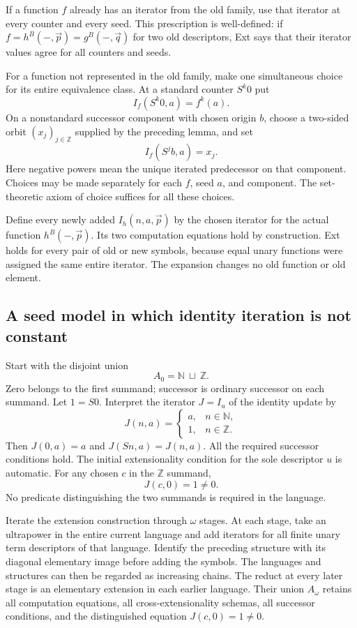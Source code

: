 If a function $f$ already has an iterator from the old family, use that
iterator at every counter and every seed. This prescription is well-defined:
if $f=h^B(-,\vec p)=g^B(-,\vec q)$ for two old descriptors, Ext says that
their iterator values agree for all counters and seeds.

For a function not represented in the old family, make one simultaneous
choice for its entire equivalence class. At a standard counter $S^k0$ put
\[
                         I_f(S^k0,a)=f^k(a).
\]
On a nonstandard successor component with chosen origin $b$, choose a
two-sided orbit $(x_j)_{j\in\mathbb Z}$ supplied by the preceding lemma,
and set
\[
                         I_f(S^j b,a)=x_j.
\]
Here negative powers mean the unique iterated predecessor on that component.
Choices may be made separately for each $f$, seed $a$, and component.
The set-theoretic axiom of choice suffices for all these choices.

Define every newly added $I_h(n,a,\vec p)$ by the chosen iterator for the
actual function $h^B(-,\vec p)$. Its two computation equations hold by
construction. Ext holds for every pair of old or new symbols, because
equal unary functions were assigned the same entire iterator. The expansion
changes no old function or old element.

\subsection{A seed model in which identity iteration is not constant}

Start with the disjoint union
\[
                         A_0=\mathbb N\ \sqcup\ \mathbb Z.
\]
Zero belongs to the first summand; successor is ordinary successor on each
summand. Let $1=S0$. Interpret the iterator $J=I_u$ of the identity update by
\[
 J(n,a)=
 \begin{cases}
 a,&n\in\mathbb N,\\
 1,&n\in\mathbb Z.
 \end{cases}
\]
Then $J(0,a)=a$ and $J(Sn,a)=J(n,a)$. All the required successor conditions
hold. The initial extensionality condition for the sole descriptor $u$ is
automatic. For any chosen $c$ in the $\mathbb Z$ summand,
\[
                           J(c,0)=1\ne0.
\]
No predicate distinguishing the two summands is required in the language.

Iterate the extension construction through $\omega$ stages. At each stage,
take an ultrapower in the entire current language and add iterators for all
finite unary term descriptors of that language. Identify the preceding
structure with its diagonal elementary image before adding the symbols.
The languages and structures can then be regarded as increasing chains.
The reduct at every later stage is an elementary extension in each earlier
language. Their union $A_\omega$ retains all computation equations, all
cross-extensionality schemas, all successor conditions, and the distinguished
equation $J(c,0)=1\ne0$.

